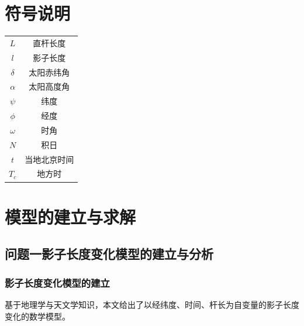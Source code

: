 \documentclass[12pt]{cumcmart}   %
\begin{document}
\section{符号说明}
\begin{center}
	\begin{tabular}{cc}
		\hline
		\makebox[0.3\textwidth][c]{符号}	&  \makebox[0.4\textwidth][c]{意义} \\ \hline
		$L$ & 直杆长度\\ \hline
       $l$  &  影子长度  \\ \hline
	  $\delta$  & 太阳赤纬角  \\ \hline
	 $\alpha$     & 太阳高度角  \\ \hline
	 	 $\psi$     & 纬度  \\ \hline
	 	 $\phi$     & 经度  \\ \hline
	 	 	 $\omega$     & 时角  \\ \hline
	 	 	 	 $N$     & 积日  \\ \hline
	 	 	 	 $t$     & 当地北京时间  \\ \hline
	 	 	 	 $T_c$     & 地方时  \\ \hline
	 	 	 
	\end{tabular}
\end{center}


\section{模型的建立与求解}

\subsection{问题一影子长度变化模型的建立与分析}

\subsubsection{影子长度变化模型的建立}
基于地理学与天文学知识，本文给出了以经纬度、时间、杆长为自变量的影子长度变化的数学模型。
\end{document}
